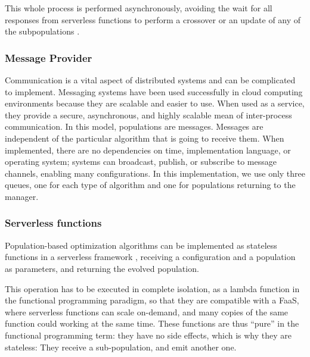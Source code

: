 \documentclass[runningheads]{llncs}
\begin{document}
This whole
  process is performed asynchronously, avoiding the wait for all responses from
  serverless functions to perform a crossover or an update of any of the
  subpopulations \cite{Lovbjerg2001,Jimeno2019}. 

  \subsubsection{Message Provider}

  Communication is a vital aspect of distributed
systems and can be complicated to implement. Messaging systems have been used
successfully in cloud computing environments because they are scalable and
easier to use. When used as a service, they provide a secure, asynchronous, and
highly scalable mean of inter-process communication.  In this model, populations
are messages.  Messages are independent of the particular algorithm that is
going to receive them. When implemented, there are no dependencies on time,
implementation language, or operating system; systems can broadcast, publish, or
subscribe to message channels, enabling many configurations. In this
implementation,  we use only three queues, one for each type of algorithm and
one for populations returning to the manager.

\subsubsection{Serverless functions}

Population-based optimization algorithms can be implemented
as stateless functions in a serverless framework  \cite{Roberts2016},
receiving a configuration and a population as 
parameters, and returning the evolved population. %

This operation has to be
executed in complete isolation, as a lambda function in the functional
programming paradigm, so that they are compatible with a FaaS, where serverless
functions can scale on-demand, and many copies of the same function could
working at the same time. %
These functions are thus ``pure'' in the functional programming term:
they have no side effects, which is why they are stateless: They
receive a sub-population, and emit another one.
\end{document}
